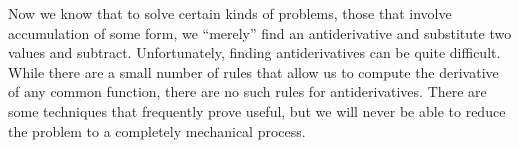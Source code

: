 \documentclass{ximera}
\begin{document}
Now we know that to solve certain kinds of problems, those that involve accumulation of some form, we ``merely'' find an
antiderivative and substitute two values and subtract. Unfortunately, finding antiderivatives can be quite difficult. While there are a
small number of rules that allow us to compute the derivative of any common function, there are no such rules for antiderivatives. There
are some techniques that frequently prove useful, but we will never be able to reduce the problem to a completely mechanical process.
\end{document}
